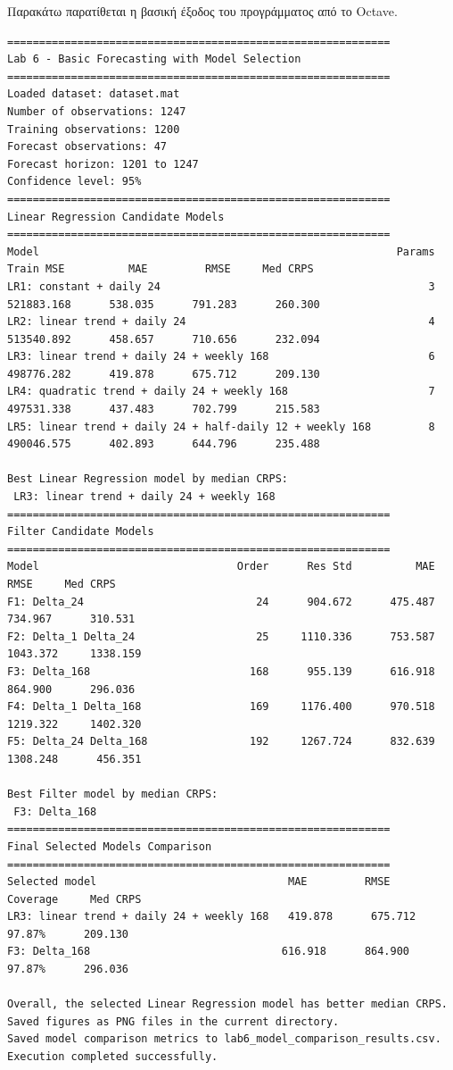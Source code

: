 \documentclass{article}
\begin{document}
Παρακάτω παρατίθεται η βασική έξοδος του προγράμματος από το Octave.

{\small
\begin{verbatim}
============================================================
Lab 6 - Basic Forecasting with Model Selection
============================================================
Loaded dataset: dataset.mat
Number of observations: 1247
Training observations: 1200
Forecast observations: 47
Forecast horizon: 1201 to 1247
Confidence level: 95%
============================================================
Linear Regression Candidate Models
============================================================
Model                                                        Params    Train MSE          MAE         RMSE     Med CRPS
LR1: constant + daily 24                                          3   521883.168      538.035      791.283      260.300
LR2: linear trend + daily 24                                      4   513540.892      458.657      710.656      232.094
LR3: linear trend + daily 24 + weekly 168                         6   498776.282      419.878      675.712      209.130
LR4: quadratic trend + daily 24 + weekly 168                      7   497531.338      437.483      702.799      215.583
LR5: linear trend + daily 24 + half-daily 12 + weekly 168         8   490046.575      402.893      644.796      235.488

Best Linear Regression model by median CRPS:
 LR3: linear trend + daily 24 + weekly 168
============================================================
Filter Candidate Models
============================================================
Model                               Order      Res Std          MAE         RMSE     Med CRPS
F1: Delta_24                           24      904.672      475.487      734.967      310.531
F2: Delta_1 Delta_24                   25     1110.336      753.587     1043.372     1338.159
F3: Delta_168                         168      955.139      616.918      864.900      296.036
F4: Delta_1 Delta_168                 169     1176.400      970.518     1219.322     1402.320
F5: Delta_24 Delta_168                192     1267.724      832.639     1308.248      456.351

Best Filter model by median CRPS:
 F3: Delta_168
============================================================
Final Selected Models Comparison
============================================================
Selected model                              MAE         RMSE     Coverage     Med CRPS
LR3: linear trend + daily 24 + weekly 168   419.878      675.712       97.87%      209.130
F3: Delta_168                              616.918      864.900       97.87%      296.036

Overall, the selected Linear Regression model has better median CRPS.
Saved figures as PNG files in the current directory.
Saved model comparison metrics to lab6_model_comparison_results.csv.
Execution completed successfully.
\end{verbatim}
}
\end{document}
